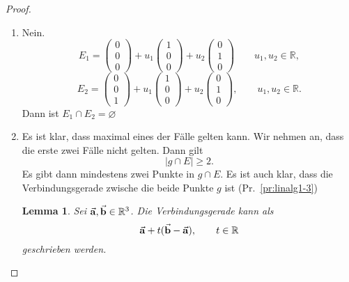 \documentclass[prb,12pt]{revtex4-2}
\newtheorem{Lemma}[Theorem]{Lemma}
\theoremstyle{definition}
\theoremstyle{definition}
\newenvironment{parts}{\begin{enumerate}[label=(\alph*)]}{\end{enumerate}}
\newcommand{\R}{\mathbb{R}}
\begin{document}
\begin{proof}
\begin{parts}
		\item Nein.
		\[
		E_1=\begin{pmatrix} 0 \\ 0 \\ 0 \end{pmatrix} +u_1 \begin{pmatrix} 1 \\ 0 \\ 0 \end{pmatrix} +u_2 \begin{pmatrix} 0 \\ 1 \\ 0 \end{pmatrix} \qquad u_1,u_2\in \R
		,\] 
		\[
		E_2=\begin{pmatrix} 0 \\ 0 \\ 1 \end{pmatrix} +u_1\begin{pmatrix} 1 \\ 0 \\ 0 \end{pmatrix}+u_2\begin{pmatrix} 0 \\ 1 \\ 0 \end{pmatrix}, \qquad u_1,u_2\in \R
		.\]
		Dann ist $E_1\cap E_2=\varnothing$
		\item Es ist klar, dass maximal eines der F\"{a}lle gelten kann. Wir nehmen an, dass die erste zwei F\"{a}lle nicht gelten. Dann gilt
		\[
		|g\cap E|\ge 2
		.\] 
		Es gibt dann mindestens zwei Punkte in $g\cap E$. Es ist auch klar, dass die Verbindungsgerade zwische die beide Punkte $g$ ist (Pr.~\ref{pr:linalg1-3})

		\begin{Lemma}
			Sei $\va a, \va b\in \R^3$. Die Verbindungsgerade kann als
			\[
			\va a+t(\va b-\va a), \qquad t\in \R\] 
			geschrieben werden.
		\end{Lemma}


\end{parts}
\end{proof}
\end{document}
